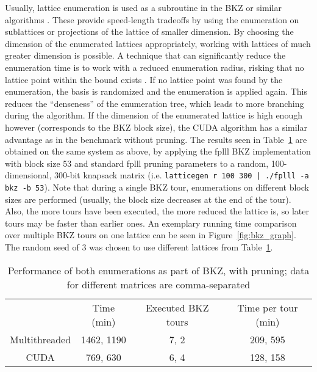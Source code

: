 \documentclass{scrartcl}
\begin{document}
    Usually, lattice enumeration is used as a subroutine in the BKZ or similar algorithms \cite{bkz}. 
    These provide speed-length tradeoffs by using the enumeration on sublattices or projections of the lattice of smaller dimension. 
    By choosing the dimension of the enumerated lattices appropriately, working with lattices of much greater dimension is possible. 
    A technique that can significantly reduce the enumeration time is to work with a reduced enumeration radius, risking that no lattice point within the bound exists \cite{pruning, bkz2}. 
    If no lattice point was found by the enumeration, the basis is randomized and the enumeration is applied again. 
    This reduces the ``denseness'' of the enumeration tree, which leads to more branching during the algorithm. 
    If the dimension of the enumerated lattice is high enough however (corresponds to the BKZ block size), the CUDA algorithm has a similar advantage as in the benchmark without pruning. 
    The results seen in Table~\ref{tab:pruning_bench} are obtained on the same system as above, by applying the fplll BKZ implementation with block size 53 and standard fplll pruning parameters to a random, 100-dimensional, 300-bit knapsack matrix (i.e. \texttt{latticegen r 100 300 | ./fplll -a bkz -b 53}). 
    Note that during a single BKZ tour, enumerations on different block sizes are performed (usually, the block size decreases at the end of the tour). 
    Also, the more tours have been executed, the more reduced the lattice is, so later tours may be faster than earlier ones. 
    An exemplary running time comparison over multiple BKZ tours on one lattice can be seen in Figure~\ref{fig:bkz_graph}. 
    The random seed of 3 was chosen to use different lattices from Table~\ref{tab:pruning_bench}.

    \begin{table}
        \begin{tabular}{c c c c}
            ~ & Time (min) & Executed BKZ tours & Time per tour (min) \\
            Multithreaded & 1462, 1190 & 7, 2 & 209, 595 \\
            CUDA & 769, 630 & 6, 4 & 128, 158
        \end{tabular}
        \caption{Performance of both enumerations as part of BKZ, with pruning; data for different matrices are comma-separated\label{tab:pruning_bench}}
    \end{table}
\end{document}
